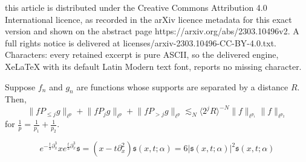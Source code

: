 \documentclass[10pt,a4paper]{amsart}
\newcommand{\fs}{\mathfrak{s}}
\newcommand{\jBra}[1]{\langle #1 \rangle}
\begin{document}
this article is distributed under the Creative Commons Attribution 4.0 International licence, as recorded in the arXiv licence metadata for this exact version and shown on the abstract page https://arxiv.org/abs/2303.10496v2. A full rights notice is delivered at licenses/arxiv-2303.10496-CC-BY-4.0.txt. Characters: every retained excerpt is pure ASCII, so the delivered engine, XeLaTeX with its default Latin Modern text font, reports no missing character.
    \begin{lemma}\label{lem:LP-pseudoloc-lemma}
        Suppose $f_n$ and $g_n$ are functions whose supports are separated by a distance $R$.  Then,
        \begin{equation*}
            \lVert f P_{\leq j} g \rVert_{\ell^p} + \lVert f P_{j} g \rVert_{\ell^p} + \lVert f P_{> j} g \rVert_{\ell^p} \lesssim_N \jBra{2^j R}^{-N}\lVert f \rVert_{\ell^{p_1}}\lVert f \rVert_{\ell^{p_2}}
        \end{equation*}
        for $\frac{1}{p} = \frac{1}{p_1} + \frac{1}{p_2}$.
    \end{lemma}

\begin{equation}\label{eqn:cmkdv-self-sim-fourier-ident}
    e^{-\frac{t}{3}\partial_x^3}xe^{\frac{t}{3} \partial_x^3} \fs = (x - t \partial_x^2) \fs(x,t;\alpha) = 6|\fs(x,t;\alpha)|^2 \fs(x,t;\alpha)
\end{equation}
\end{document}
